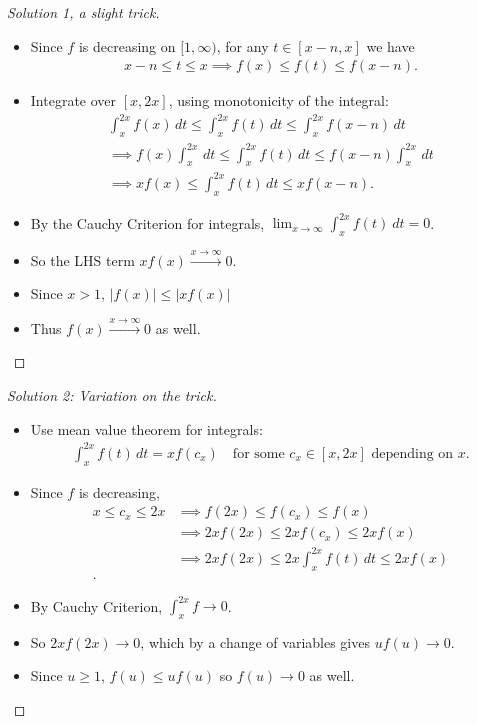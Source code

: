 \begin{solution}[of b]

\envlist

\begin{proof}[Solution 1, a slight trick]

\envlist

\begin{itemize}
\item
  Since \(f\) is decreasing on \([1, \infty)\), for any
  \(t\in [x-n, x]\) we have
  \begin{align*}
  x-n \leq t \leq x \implies f(x) \leq f(t) \leq f(x-n)
  .\end{align*}
\item
  Integrate over \([x, 2x]\), using monotonicity of the integral:
  \begin{align*}
  \int_x^{2x} f(x) \,dt \leq 
  \int_x^{2x} f(t) \,dt \leq 
  \int_x^{2x} f(x-n) \,dt \\ 
  \implies 
  f(x) \int_x^{2x} \,dt \leq 
  \int_x^{2x} f(t) \,dt \leq 
  f(x-n) \int_x^{2x} \,dt  \\
  \implies xf(x) \leq \int_x^{2x} f(t) \, dt \leq xf(x-n)
  .\end{align*}
\item
  By the Cauchy Criterion for integrals,
  \(\lim_{x\to \infty} \int_x^{2x} f(t)~dt = 0\).
\item
  So the LHS term \(xf(x) \overset{x\to\infty}\longrightarrow 0\).
\item
  Since \(x>1\),
  \({\left\lvert {f(x)} \right\rvert} \leq {\left\lvert {xf(x)} \right\rvert}\)
\item
  Thus \(f(x) \overset{x\to\infty}\longrightarrow 0\) as well.
\end{itemize}

\end{proof}

\begin{proof}[Solution 2: Variation on the trick]

\envlist

\begin{itemize}
\item
  Use mean value theorem for integrals:
  \begin{align*}
  \int_x^{2x} f(t)\, dt = xf(c_x) \quad\text{for some $c_x \in [x, 2x]$ depending on $x$}
  .\end{align*}
\item
  Since \(f\) is decreasing,
  \begin{align*}
  x\leq c_x \leq 2x 
  &\implies f(2x)\leq f(c_x) \leq f(x) \\
  &\implies 2xf(2x)\leq 2xf(c_x) \leq 2xf(x) \\
  &\implies 2xf(2x)\leq 2x\int_x^{2x} f(t)\, dt \leq 2xf(x) \\
  .\end{align*}
\item
  By Cauchy Criterion, \(\int_x^{2x} f \to 0\).
\item
  So \(2x f(2x) \to 0\), which by a change of variables gives
  \(uf(u) \to 0\).
\item
  Since \(u\geq 1\), \(f(u) \leq uf(u)\) so \(f(u) \to 0\) as well.
\end{itemize}


\end{proof}
\end{solution}
